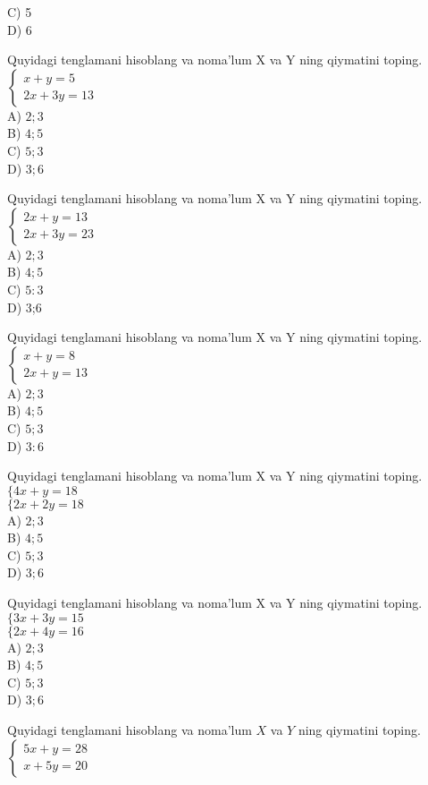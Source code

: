 C) 5\\
D) 6
  \item Quyidagi tenglamani hisoblang va noma'lum X va Y ning qiymatini toping. $\left\{\begin{array}{c}x+y=5 \\ 2 x+3 y=13\end{array}\right.$\\
A) $2 ; 3$\\
B) $4 ; 5$\\
C) $5 ; 3$\\
D) $3 ; 6$
  \item Quyidagi tenglamani hisoblang va noma'lum X va Y ning qiymatini toping. $\left\{\begin{array}{c}2 x+y=13 \\ 2 x+3 y=23\end{array}\right.$\\
A) $2 ; 3$\\
B) $4 ; 5$\\
C) $5: 3$\\
D) 3;6
  \item Quyidagi tenglamani hisoblang va noma'lum X va Y ning qiymatini toping. $\left\{\begin{array}{c}x+y=8 \\ 2 x+y=13\end{array}\right.$\\
A) $2 ; 3$\\
B) $4 ; 5$\\
C) $5 ; 3$\\
D) $3: 6$
  \item Quyidagi tenglamani hisoblang va noma'lum X va Y ning qiymatini toping. $\{4 x+y=18$\\
$\{2 x+2 y=18$\\
A) $2 ; 3$\\
B) $4 ; 5$\\
C) $5 ; 3$\\
D) $3 ; 6$
  \item Quyidagi tenglamani hisoblang va noma'lum X va Y ning qiymatini toping. $\{3 x+3 y=15$\\
$\{2 x+4 y=16$\\
A) $2 ; 3$\\
B) $4 ; 5$\\
C) $5 ; 3$\\
D) $3 ; 6$
  \item Quyidagi tenglamani hisoblang va noma'lum $X$ va $Y$ ning qiymatini toping. $\left\{\begin{array}{l}5 x+y=28 \\ x+5 y=20\end{array}\right.$\\

